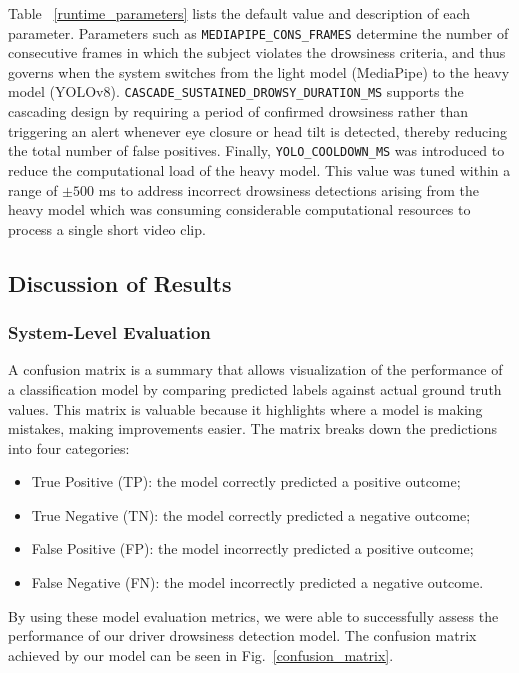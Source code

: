 \documentclass[pdflatex,sn-mathphys-num]{sn-jnl}
\theoremstyle{thmstyleone}%
\theoremstyle{thmstyletwo}%
\theoremstyle{thmstylethree}%
\begin{document}
	Table ~\ref{runtime_parameters} lists the default value and description of each parameter. 
	Parameters such as {\scriptsize\texttt{MEDIAPIPE\_CONS\_FRAMES}} determine the number of consecutive frames in which the subject violates the drowsiness criteria, and thus governs when the system switches from the light model (MediaPipe) to the heavy model (YOLOv8).
	{\scriptsize\texttt{CASCADE\_SUSTAINED\_DROWSY\_DURATION\_MS}} supports the cascading design by requiring a period of confirmed drowsiness rather than triggering an alert whenever eye closure or head tilt is detected, thereby reducing the total number of false positives. Finally, {\scriptsize\texttt{YOLO\_COOLDOWN\_MS}} was introduced to reduce the computational load of the heavy model. This value was tuned within a range of $\pm500$ ms to address incorrect drowsiness detections arising from the heavy model which was consuming considerable computational resources to process a single short video clip. 
	
	
	
	\subsection{Discussion of Results}\label{sec:results}
	\subsubsection{System-Level Evaluation}\label{subsec:system}
	A confusion matrix is a summary that allows visualization of the performance of a classification model by comparing predicted labels against actual ground truth values. This matrix is valuable because it highlights where a model is making mistakes, making improvements easier. The matrix breaks down the predictions into four categories:
	\begin{itemize}
		\item True Positive (TP): the model correctly predicted a positive outcome;
		\item True Negative (TN): the model correctly predicted a negative outcome;
		\item False Positive (FP): the model incorrectly predicted a positive outcome;
		\item False Negative (FN): the model incorrectly predicted a negative outcome.
	\end{itemize} 
	
	By using these model evaluation metrics, we were able to successfully assess the performance of our driver drowsiness detection model. The confusion matrix achieved by our model can be seen in Fig.~\ref{confusion_matrix}.
	
\end{document}
